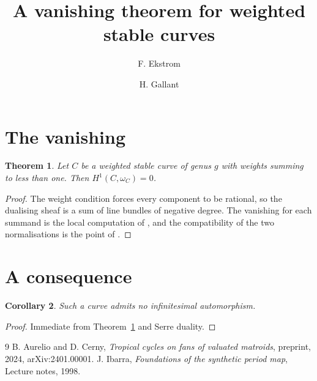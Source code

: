 \documentclass{article}
\title{A vanishing theorem for weighted stable curves}
\author{F. Ekstrom \and H. Gallant}
\newtheorem{theorem}{Theorem}[section]
\newtheorem{corollary}[theorem]{Corollary}
\begin{document}
\maketitle

\section{The vanishing}

\begin{theorem}\label{thm:vanish}
Let $C$ be a weighted stable curve of genus $g$ with weights summing to less than one. Then $H^1(C, \omega_C) = 0$.
\end{theorem}

\begin{proof}
The weight condition forces every component to be rational, so the dualising sheaf is a sum of line bundles of negative degree. The vanishing for each summand is the local computation of \cite[Theorem 1.1]{other}, and the compatibility of the two normalisations is the point of \cite{third}.
\end{proof}

\section{A consequence}

\begin{corollary}\label{cor:rigid}
Such a curve admits no infinitesimal automorphism.
\end{corollary}

\begin{proof}
Immediate from Theorem~\ref{thm:vanish} and Serre duality.
\end{proof}

\begin{thebibliography}{9}
 B. Aurelio and D. Cerny, \emph{Tropical cycles on fans of valuated matroids}, preprint, 2024, arXiv:2401.00001.
 J. Ibarra, \emph{Foundations of the synthetic period map}, Lecture notes, 1998.
\end{thebibliography}
\end{document}
